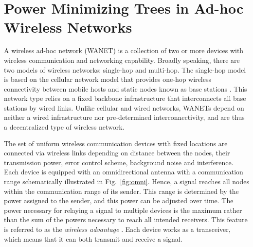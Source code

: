 \chapter{Power Minimizing Trees in Ad-hoc Wireless Networks}\label{chap:wanet}

A wireless ad-hoc network (WANET) is a collection of two or more devices with wireless communication and networking capability.
Broadly speaking, there are two models of wireless networks: single-hop and multi-hop.
The single-hop model is based on the cellular network model that provides one-hop wireless connectivity between mobile hosts and static nodes known as base stations \cite{clementi01}.
This network type relies on a fixed backbone infrastructure that interconnects all base stations by wired links.
Unlike cellular and wired networks, WANETs depend on neither a wired infrastructure nor pre-determined interconnectivity, and are thus a decentralized type of wireless network.

The set of uniform wireless communication devices with fixed locations are connected via wireless links depending on 
distance between the nodes, their transmission power, error control scheme, background noise and interference.
Each device is equipped with an omnidirectional antenna with a communication range schematically illustrated in Fig.~\ref{fig:omni}.
Hence, a signal reaches all nodes within the communication range of its sender.
This range is determined by the power assigned to the sender, and this power can be adjusted over time.
The power necessary for relaying a signal to multiple devices is the maximum rather than the sum of the powers necessary to reach all intended receivers.
This feature is referred to as the \emph{wireless advantage} \cite{wieselthier00}.
Each device works as a transceiver, which means that it can both transmit and receive a signal.

